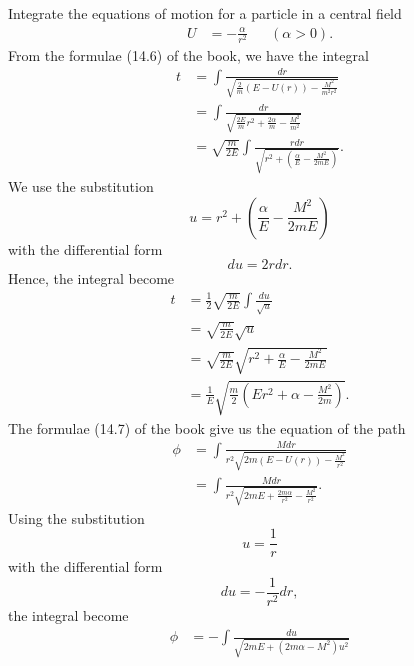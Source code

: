 
\begin{problem}
{
Integrate the equations of motion for a particle in a central field
\begin{align*}
    U &= -\frac{\alpha}{r^2} & &(\alpha > 0).
\end{align*}
}
{
From the formulae (14.6) of the book, we have the integral
\begin{align*}
    t &= \int \frac{dr}{\sqrt{\frac{2}{m}\left(E-U(r)\right)-\frac{M^2}{m^2r^2}}} \\
    &= \int \frac{dr}{\sqrt{\frac{2E}{m}r^2+\frac{2\alpha}{m}-\frac{M^2}{m^2}}} \\
    &= \sqrt{\frac{m}{2E}}\int \frac{rdr}{\sqrt{r^2+\left( \frac{\alpha}{E} - \frac{M^2}{2mE}\right)}}.
\end{align*}
We use the substitution
\begin{equation*}
    u = r^2 + \left( \frac{\alpha}{E} - \frac{M^2}{2mE}\right)
\end{equation*}
with the differential form
\begin{equation*}
    du = 2rdr.
\end{equation*}
Hence, the integral become
\begin{align*}
    t &= \frac{1}{2} \sqrt{\frac{m}{2E}} \int\frac{du}{\sqrt{u}} \\
    &= \sqrt{\frac{m}{2E}} \sqrt{u} \\
    &= \sqrt{\frac{m}{2E}} \sqrt{r^2 + \frac{\alpha}{E} - \frac{M^2}{2mE}} \\
    &= \frac{1}{E} \sqrt{\frac{m}{2}\left( Er^2 + \alpha - \frac{M^2}{2m} \right)} .
\end{align*}
The formulae (14.7) of the book give us the equation of the path
\begin{align*}
    \phi &= \int \frac{Mdr}{r^2\sqrt{2m\left(E-U(r)\right)-\frac{M^2}{r^2}}} \\
    &= \int \frac{Mdr}{r^2\sqrt{2mE+\frac{2m\alpha}{r^2}-\frac{M^2}{r^2}}}.
\end{align*}
Using the substitution
\begin{equation*}
    u = \frac{1}{r}
\end{equation*}
with the differential form
\begin{equation*}
    du = -\frac{1}{r^2}dr,
\end{equation*}
the integral become
\begin{align}
    \phi &= - \int \frac{du}{\sqrt{2mE + \left( 2m\alpha - M^2 \right)u^2}} \nonumber \\

\end{align}}
\end{problem}
